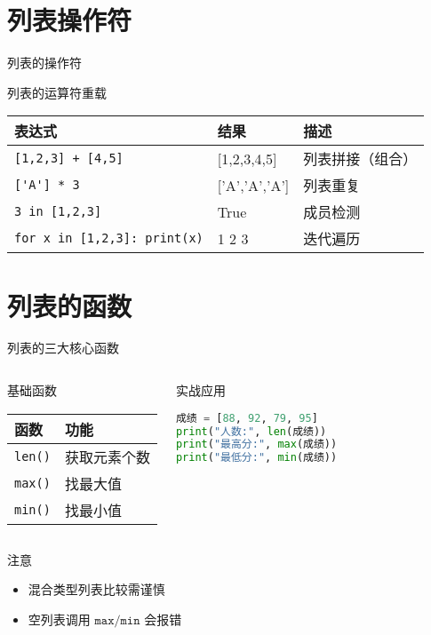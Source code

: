 \documentclass{beamer}
\begin{document}
\section{列表操作符}
\begin{frame}[fragile]{列表的操作符}
\begin{block}{列表的运算符重载}
\begin{tabular}{|l|l|p{3cm}|}
\hline
\textcolor{cuhksz1}{表达式} & \textcolor{cuhksz1}{结果} & \textcolor{cuhksz1}{描述} \\ \hline
\lstinline|[1,2,3] + [4,5]| & [1,2,3,4,5] & 列表拼接（组合）\\ \hline
\lstinline|['A'] * 3| & ['A','A','A'] & 列表重复\\ \hline
\lstinline|3 in [1,2,3]| & True & 成员检测\\ \hline
\lstinline|for x in [1,2,3]: print(x)| & 1 2 3 & 迭代遍历\\ \hline
\end{tabular}
\end{block}
\end{frame}

\section{列表的函数}
\begin{frame}[fragile]{列表的三大核心函数}
\begin{columns}[T]
\begin{block}{基础函数}
\begin{tabular}{|l|l|}
\hline
\textcolor{cuhksz2}{函数} & \textcolor{cuhksz2}{功能} \\ \hline
\lstinline|len()| & 获取元素个数 \\ \hline
\lstinline|max()| & 找最大值 \\ \hline
\lstinline|min()| & 找最小值 \\ \hline
\end{tabular}
\end{block}

\begin{exampleblock}{实战应用}
\begin{lstlisting}[language=Python]
成绩 = [88, 92, 79, 95]
print("人数:", len(成绩))
print("最高分:", max(成绩))
print("最低分:", min(成绩))
\end{lstlisting}
\end{exampleblock}
\end{columns}

\begin{alertblock}{注意}
\begin{itemize}
\item 混合类型列表比较需谨慎
\item 空列表调用 $\texttt{max/min}$ 会报错
\end{itemize}
\end{alertblock}
\end{frame}
\end{document}
